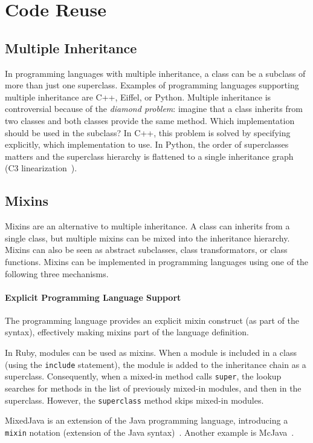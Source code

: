 \section{Code Reuse}

\subsection{Multiple Inheritance}
\label{sec:rel_mult_inhh}
In programming languages with multiple inheritance, a class can be a subclass of more than just one superclass. Examples of programming languages supporting multiple inheritance are C++, Eiffel, or Python. Multiple inheritance is controversial because of the \emph{diamond problem}: imagine that a class inherits from two classes and both classes provide the same method. Which implementation should be used in the subclass? In C++, this problem is solved by specifying explicitly, which implementation to use. In Python, the order of superclasses matters and the superclass hierarchy is flattened to a single inheritance graph (C3 linearization~\cite{pythonmro23}).

\subsection{Mixins}
Mixins are an alternative to multiple inheritance. A class can inherits from a single class, but multiple mixins can be mixed into the inheritance hierarchy. Mixins can also be seen as abstract subclasses, class transformators, or class functions. Mixins can be implemented in programming languages using one of the following three mechanisms.

\paragraph{Explicit Programming Language Support}
The programming language provides an explicit mixin construct (as part of the syntax), effectively making mixins part of the language definition.

In Ruby, modules can be used as mixins. When a module is included in a class (using the \texttt{include} statement), the module is added to the inheritance chain as a superclass. Consequently, when a mixed-in method calls \texttt{super}, the lookup searches for methods in the list of previously mixed-in modules, and then in the superclass. However, the \texttt{superclass} method skips mixed-in modules.

MixedJava is an extension of the Java programming language, introducing a \texttt{mixin} notation (extension of the Java syntax)~\cite{Flatt:1998:CM:268946.268961}. Another example is McJava~\cite{mcjava}.

